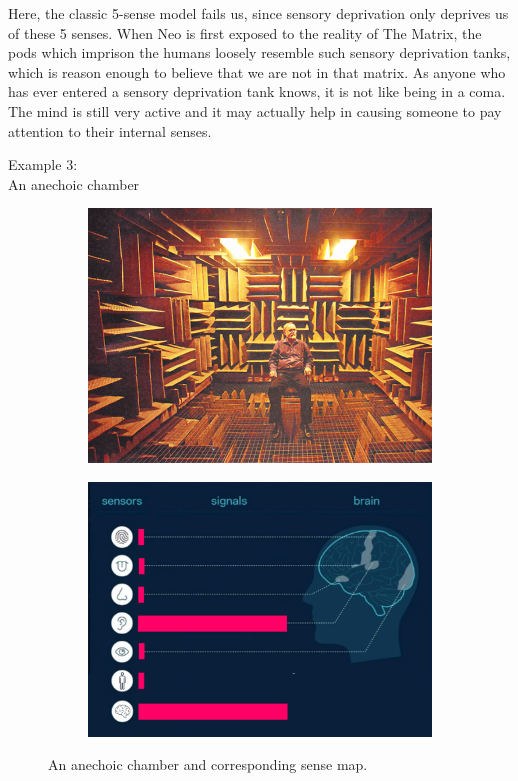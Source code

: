 \documentclass{article}
\begin{document}
Here, the classic 5-sense model fails us, since sensory deprivation only deprives us of these 5 senses. When Neo is first exposed to the reality of The Matrix, the pods which imprison the humans loosely resemble such sensory deprivation tanks, which is reason enough to believe that we are not in that matrix. As anyone who has ever entered a sensory deprivation tank knows, it is not like being in a coma. The mind is still very active and it may actually help in causing someone to pay attention to their internal senses.


\pagebreak

\begin{center}
  \LARGE{Example 3:}\\
  \LARGE{An anechoic chamber}
\end{center}

\begin{figure}[h!]
  \centering
  \begin{subfigure}[b]{0.48\linewidth}
    \includegraphics[width=\linewidth]{images/attention3-chamber.png}
  \end{subfigure}
  \begin{subfigure}[b]{0.48\linewidth}
    \includegraphics[width=\linewidth]{images/ma-anechoic-chamber.png}
  \end{subfigure}
  \caption{An anechoic chamber and corresponding sense map.}
  \label{fig:anechoic-chamber}
\end{figure}
\end{document}
